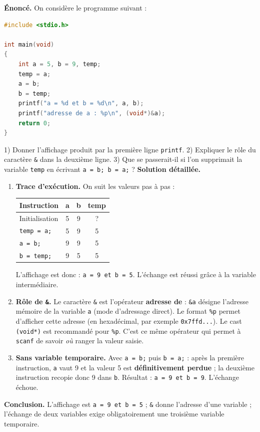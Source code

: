 \documentclass[11pt]{article}
\begin{document}
\begin{exoresolu}
\textbf{Énoncé.} On considère le programme suivant :
\begin{lstlisting}[language=C]
#include <stdio.h>

int main(void)
{
    int a = 5, b = 9, temp;
    temp = a;
    a = b;
    b = temp;
    printf("a = %d et b = %d\n", a, b);
    printf("adresse de a : %p\n", (void*)&a);
    return 0;
}
\end{lstlisting}
1) Donner l'affichage produit par la première ligne \texttt{printf}. 2) Expliquer le rôle du caractère \texttt{\&} dans la deuxième ligne. 3) Que se passerait-il si l'on supprimait la variable \texttt{temp} en écrivant \texttt{a = b; b = a;} ?
\tcblower
\textbf{Solution détaillée.}
\begin{enumerate}
\item \textbf{Trace d'exécution.} On suit les valeurs pas à pas :
\begin{center}
\begin{tabular}{|l|c|c|c|}
\hline
\rowcolor{popblueL} \textbf{Instruction} & \textbf{a} & \textbf{b} & \textbf{temp} \\
\hline
Initialisation & 5 & 9 & ? \\
\hline
\texttt{temp = a;} & 5 & 9 & 5 \\
\hline
\texttt{a = b;} & 9 & 9 & 5 \\
\hline
\texttt{b = temp;} & 9 & 5 & 5 \\
\hline
\end{tabular}
\end{center}
L'affichage est donc : \texttt{a = 9 et b = 5}. L'échange est réussi grâce à la variable intermédiaire.
\item \textbf{Rôle de \texttt{\&}.} Le caractère \texttt{\&} est l'opérateur \textbf{adresse de} : \texttt{\&a} désigne l'adresse mémoire de la variable \texttt{a} (mode d'adressage direct). Le format \texttt{\%p} permet d'afficher cette adresse (en hexadécimal, par exemple \texttt{0x7ffd...}). Le cast \texttt{(void*)} est recommandé pour \texttt{\%p}. C'est ce même opérateur qui permet à \texttt{scanf} de savoir \emph{où} ranger la valeur saisie.
\item \textbf{Sans variable temporaire.} Avec \texttt{a = b;} puis \texttt{b = a;} : après la première instruction, \texttt{a} vaut 9 et la valeur 5 est \textbf{définitivement perdue} ; la deuxième instruction recopie donc 9 dans \texttt{b}. Résultat : \texttt{a = 9 et b = 9}. L'échange échoue.
\end{enumerate}
\textbf{Conclusion.} L'affichage est \texttt{a = 9 et b = 5} ; \texttt{\&} donne l'adresse d'une variable ; l'échange de deux variables exige obligatoirement une troisième variable temporaire.
\end{exoresolu}
\end{document}
